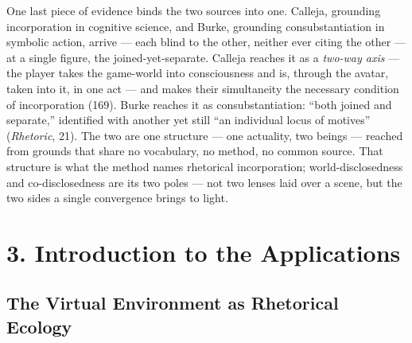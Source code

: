 \documentclass{article}
\begin{document}
One last piece of evidence binds the two sources into one. Calleja, grounding incorporation in cognitive science, and Burke, grounding consubstantiation in symbolic action, arrive — each blind to the other, neither ever citing the other — at a single figure, the joined-yet-separate. Calleja reaches it as a \textit{two-way axis} — the player takes the game-world into consciousness and is, through the avatar, taken into it, in one act — and makes their simultaneity the necessary condition of incorporation (169). Burke reaches it as consubstantiation: ``both joined and separate,'' identified with another yet still ``an individual locus of motives'' (\textit{Rhetoric}, 21). The two are one structure — one actuality, two beings — reached from grounds that share no vocabulary, no method, no common source. That structure is what the method names rhetorical incorporation; world-disclosedness and co-disclosedness are its two poles — not two lenses laid over a scene, but the two sides a single convergence brings to light.

\bigskip

\bigskip

\section*{3. Introduction to the Applications}

\subsection*{The Virtual Environment as Rhetorical Ecology}
\end{document}
